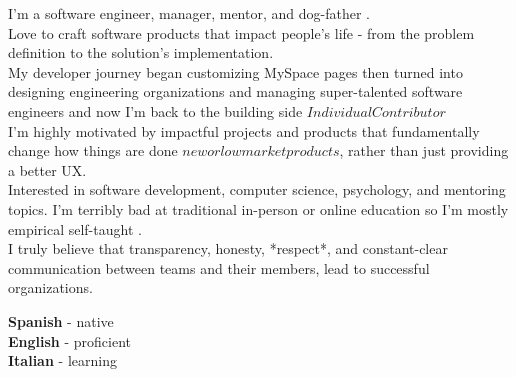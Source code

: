 \documentclass[9pt]{developercv} %
\begin{document}
\vspace{0.5cm}


\begin{minipage}[t]{0.6\textwidth} %

    \vspace{-\baselineskip} %


    {
        I'm a software engineer, manager, mentor, and dog-father . \\

         Love to craft software products that impact people's life - from the problem definition to the solution's implementation.  \\

         My developer journey began customizing MySpace pages then turned into designing engineering organizations and managing super-talented software engineers and now I'm back to the building side \(Individual Contributor\) \\

         I'm highly motivated by impactful projects and products that fundamentally change how things are done \(new or low market products\), rather than just providing a better UX. \\

         Interested in software development, computer science, psychology, and mentoring topics. I'm terribly bad at traditional in-person or online education so I'm mostly empirical self-taught . \\

         I truly believe that transparency, honesty, *respect*, and constant-clear communication between teams and their members, lead to successful organizations.
    }
    

\end{minipage}
\hfill
\begin{minipage}[t]{0.3\textwidth}
    \vspace{-\baselineskip} %


    \textbf{Spanish} - native\\
    \textbf{English} - proficient\\
    \textbf{Italian} - learning
\end{minipage}
\end{document}
